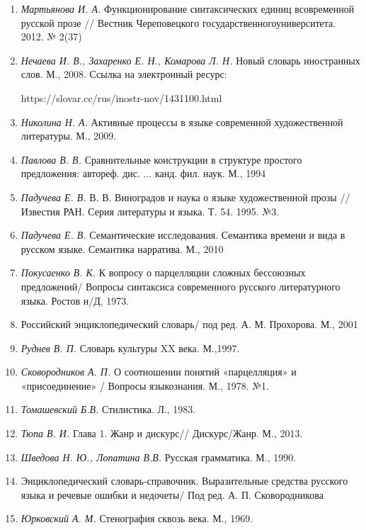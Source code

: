 \begin{enumerate}
        \item \textit{Мартьянова И. А.} Функционирование синтаксических единиц всовременной русской прозе // Вестник Череповецкого государственногоуниверситета. 2012. № 2(37)
        \item \textit{Нечаева И. В., Захаренко Е. Н., Комарова Л. Н.} Новый словарь иностранных слов. М., 2008. Ссылка на электронный ресурс:\par https://slovar.cc/rus/inostr-nov/1431100.html
        \item \textit{Николина Н. А.} Активные процессы в языке современной художественной литературы. М., 2009.
        \item \textit{Павлова В. В.} Сравнительные конструкции в структуре простого предложения: автореф. дис. ... канд. фил. наук. М., 1994
        \item \textit{Падучева Е. В.} В. В. Виноградов и наука о языке художественной прозы // Известия РАН. Серия литературы и языка. Т. 54. 1995. №3.
        \item \textit{Падучева Е. В.} Семантические исследования. Семантика времени и вида в русском языке. Семантика нарратива. М., 2010
         \item \textit{Покусаенко В. К.} К вопросу о парцелляции сложных бессоюзных предложений/ Вопросы синтаксиса современного русского литературного языка. Ростов н/Д, 1973.
        \item Российский энциклопедический словарь/ под ред. А. М. Прохорова. М., 2001 
        \item \textit{Руднев В. П.} Словарь культуры XX века. М.,1997.
        \item \textit{Сковородников А. П.} О соотношении понятий «парцелляция» и «присоединение» / Вопросы языкознания. М., 1978. №1.
        \item \textit{Томашевский Б.В.} Стилистика. Л., 1983.
        \item \textit{Тюпа В. И.} Глава 1. Жанр и дискурс// Дискурс/Жанр. М., 2013.
        \item \textit{Шведова Н. Ю., Лопатина В.В.} Русская грамматика. М., 1990. 
        \item Энциклопедический словарь-справочник. Выразительные средства русского языка и речевые ошибки и недочеты/ Под ред. А. П. Сковородникова
        \item \textit{Юрковский А. М.} Стенография сквозь века. М., 1969.
      \end{enumerate}